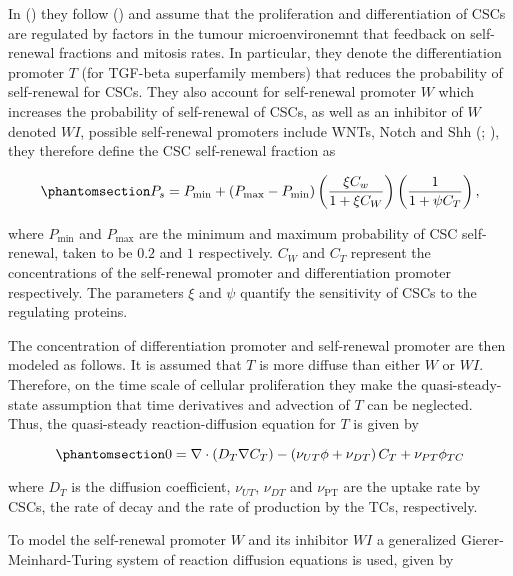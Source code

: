 \documentclass[
  letterpaper,
]{scrreprt}
\theoremstyle{definition}
\theoremstyle{remark}
\begin{document}
In () they follow
() and assume that the
proliferation and differentiation of CSCs are regulated by factors in
the tumour microenvironemnt that feedback on self-renewal fractions and
mitosis rates. In particular, they denote the differentiation promoter
\(T\) (for TGF-beta superfamily members) that reduces the probability of
self-renewal for CSCs. They also account for self-renewal promoter \(W\)
which increases the probability of self-renewal of CSCs, as well as an
inhibitor of \(W\) denoted \(WI\), possible self-renewal promoters
include WNTs, Notch and Shh (; ), they therefore define the CSC self-renewal fraction as

\begin{equation}\phantomsection\label{eq-youssefpour-Ps}{
P_s = P_\text{min} + (P_\text{max} - P_\text{min}) \left( \frac{\xi C_w}{1 + \xi C_W} \right)\left( \frac{1}{1 + \psi C_T} \right),
}\end{equation}

where \(P_\text{min}\) and \(P_\text{max}\) are the minimum and maximum
probability of CSC self-renewal, taken to be \(0.2\) and \(1\)
respectively. \(C_W\) and \(C_T\) represent the concentrations of the
self-renewal promoter and differentiation promoter respectively. The
parameters \(\xi\) and \(\psi\) quantify the sensitivity of CSCs to the
regulating proteins.

The concentration of differentiation promoter and self-renewal promoter
are then modeled as follows. It is assumed that \(T\) is more diffuse
than either \(W\) or \(WI\). Therefore, on the time scale of cellular
proliferation they make the quasi-steady-state assumption that time
derivatives and advection of \(T\) can be neglected. Thus, the
quasi-steady reaction-diffusion equation for \(T\) is given by

\begin{equation}\phantomsection\label{eq-youssefpour-T}{
0 = \nabla \cdot (D_T \nabla C_T) - \left( \nu_{UT} \phi + \nu_{DT} \right) C_T + \nu_{PT}\phi_{TC}
}\end{equation}

where \(D_T\) is the diffusion coefficient, \(\nu_{UT}\), \(\nu_{DT}\)
and \(\nu_\text{PT}\) are the uptake rate by CSCs, the rate of decay and
the rate of production by the TCs, respectively.

To model the self-renewal promoter \(W\) and its inhibitor \(WI\) a
generalized Gierer-Meinhard-Turing system of reaction diffusion
equations is used, given by
\end{document}
